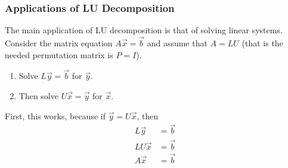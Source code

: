 \subsubsection{Applications of LU Decomposition}

The main application of LU decomposition is that of solving linear systems.  Consider the matrix equation $A\vec{x} = \vec{b}$ and assume that $A=LU$  (that is the needed permutation matrix is $P=I$).  


\begin{enumerate}
\item Solve $L\vec{y} = \vec{b}$ for $\vec{y}$.  
\item Then solve $U\vec{x} = \vec{y}$ for $\vec{x}$.  
\end{enumerate}

First, this works, because if $\vec{y} = U\vec{x}$, then
\begin{align*}
L\vec{y} & = \vec{b} \\
L U\vec{x} & = \vec{b} \\
A \vec{x} & = \vec{b}
\end{align*}


